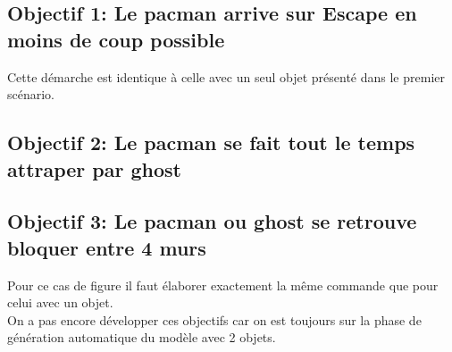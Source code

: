 \subsection{Objectif 1: Le pacman arrive sur Escape en moins de coup possible}
Cette démarche est identique à celle avec un seul objet présenté dans le premier scénario.
\subsection{Objectif 2: Le pacman se fait tout le temps attraper par ghost}
\subsection{Objectif 3: Le pacman ou ghost se retrouve bloquer entre 4 murs}
Pour ce cas de figure il faut élaborer exactement la même commande que pour celui avec un objet.
\\
On a pas encore développer ces objectifs car on est toujours sur la phase de génération automatique du modèle avec 2 objets.














